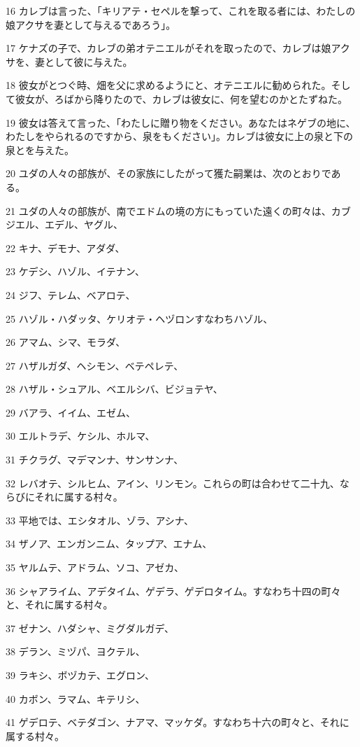 \par 16 カレブは言った、「キリアテ・セペルを撃って、これを取る者には、わたしの娘アクサを妻として与えるであろう」。
\par 17 ケナズの子で、カレブの弟オテニエルがそれを取ったので、カレブは娘アクサを、妻として彼に与えた。
\par 18 彼女がとつぐ時、畑を父に求めるようにと、オテニエルに勧められた。そして彼女が、ろばから降りたので、カレブは彼女に、何を望むのかとたずねた。
\par 19 彼女は答えて言った、「わたしに贈り物をください。あなたはネゲブの地に、わたしをやられるのですから、泉をもください」。カレブは彼女に上の泉と下の泉とを与えた。
\par 20 ユダの人々の部族が、その家族にしたがって獲た嗣業は、次のとおりである。
\par 21 ユダの人々の部族が、南でエドムの境の方にもっていた遠くの町々は、カブジエル、エデル、ヤグル、
\par 22 キナ、デモナ、アダダ、
\par 23 ケデシ、ハゾル、イテナン、
\par 24 ジフ、テレム、ベアロテ、
\par 25 ハゾル・ハダッタ、ケリオテ・ヘヅロンすなわちハゾル、
\par 26 アマム、シマ、モラダ、
\par 27 ハザルガダ、ヘシモン、ベテペレテ、
\par 28 ハザル・シュアル、ベエルシバ、ビジョテヤ、
\par 29 バアラ、イイム、エゼム、
\par 30 エルトラデ、ケシル、ホルマ、
\par 31 チクラグ、マデマンナ、サンサンナ、
\par 32 レバオテ、シルヒム、アイン、リンモン。これらの町は合わせて二十九、ならびにそれに属する村々。
\par 33 平地では、エシタオル、ゾラ、アシナ、
\par 34 ザノア、エンガンニム、タップア、エナム、
\par 35 ヤルムテ、アドラム、ソコ、アゼカ、
\par 36 シャアライム、アデタイム、ゲデラ、ゲデロタイム。すなわち十四の町々と、それに属する村々。
\par 37 ゼナン、ハダシャ、ミグダルガデ、
\par 38 デラン、ミヅパ、ヨクテル、
\par 39 ラキシ、ボヅカテ、エグロン、
\par 40 カボン、ラマム、キテリシ、
\par 41 ゲデロテ、ベテダゴン、ナアマ、マッケダ。すなわち十六の町々と、それに属する村々。
